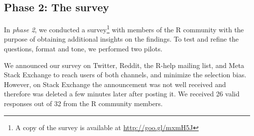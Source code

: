 \subsection{Phase 2: The survey} 

In \textit{phase 2}, we conducted a survey\footnote{A copy of the survey is available at \url{http://goo.gl/mxmH5J}} with members of the R community with the purpose of obtaining additional insights on the findings.
To test and refine the questions, format and tone, we performed two pilots.

We announced our survey on Twitter, Reddit, the R-help mailing list, and Meta Stack Exchange to reach users of both channels, and minimize the selection bias.
However, on Stack Exchange the announcement was not well received and therefore was deleted a few minutes later after posting it.
We received 26 valid responses out of 32 from the R community members.


